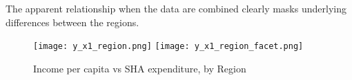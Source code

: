 \documentclass[12pt,letterpaper]{article}
\begin{document}
\begin{itemize}
    The apparent relationship when the data are combined clearly masks underlying differences
    between the regions.

    \begin{figure}
      \texttt{[image: y\_x1\_region.png]}
    	\texttt{[image: y\_x1\_region\_facet.png]}
      \caption{Income per capita vs SHA expenditure, by Region}\label{x1_regions}
    \end{figure}

	\end{itemize}

\clearpage	
\newpage

  
\end{document}
